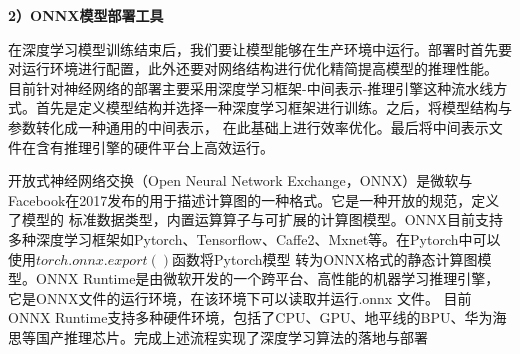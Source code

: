\textbf{2）ONNX模型部署工具}

在深度学习模型训练结束后，我们要让模型能够在生产环境中运行。部署时首先要对运行环境进行配置，此外还要对网络结构进行优化精简提高模型的推理性能。
目前针对神经网络的部署主要采用深度学习框架-中间表示-推理引擎这种流水线方式。首先是定义模型结构并选择一种深度学习框架进行训练。之后，将模型结构与参数转化成一种通用的中间表示，
在此基础上进行效率优化。最后将中间表示文件在含有推理引擎的硬件平台上高效运行。

开放式神经网络交换（Open Neural Network Exchange，ONNX）是微软与Facebook在2017发布的用于描述计算图的一种格式。它是一种开放的规范，定义了模型的
标准数据类型，内置运算算子与可扩展的计算图模型。ONNX目前支持多种深度学习框架如Pytorch、Tensorflow、Caffe2、Mxnet等。在Pytorch中可以使用$torch.onnx.export()$函数将Pytorch模型
转为ONNX格式的静态计算图模型。ONNX Runtime是由微软开发的一个跨平台、高性能的机器学习推理引擎，它是ONNX文件的运行环境，在该环境下可以读取并运行.onnx 文件。
目前ONNX Runtime支持多种硬件环境，包括了CPU、GPU、地平线的BPU、华为海思等国产推理芯片。完成上述流程实现了深度学习算法的落地与部署
